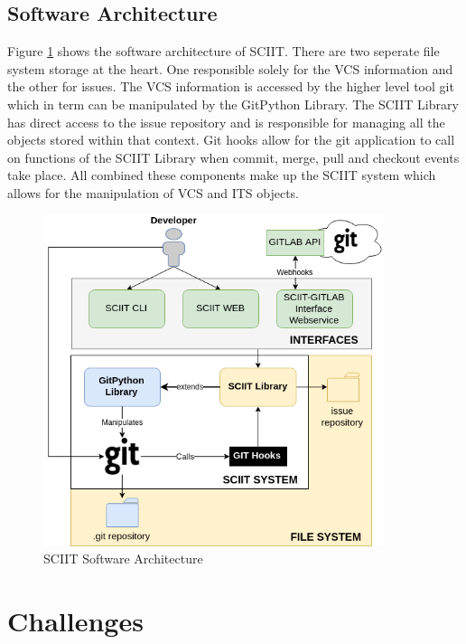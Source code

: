 \documentclass{mproj}
\begin{document}
\subsection{Software Architecture}

Figure \ref{fig:sciit-software-arch} shows the software architecture of SCIIT. There are two seperate file system storage at the heart. One responsible solely for the VCS information and the other for issues. The VCS information is accessed by the higher level tool git which in term can be manipulated by the GitPython Library. The SCIIT Library has direct access to the issue repository and is responsible for managing all the objects stored within that context. Git hooks allow for the git application to call on functions of the SCIIT Library when commit, merge, pull and checkout events take place. All combined these components make up the SCIIT system which allows for the manipulation of VCS and ITS objects.


\begin{figure}[t]
\caption{SCIIT Software Architecture}
\label{fig:sciit-software-arch}
\centering
\includegraphics[width=10cm]{sciit-software-arch}
\end{figure}








\section{Challenges}
\end{document}
